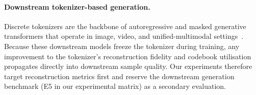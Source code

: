 \paragraph{Downstream tokenizer-based generation.}
Discrete tokenizers are the backbone of autoregressive and masked
generative transformers that operate in image, video, and
unified-multimodal settings~\citep{esser2021vqgan,chang2022maskgit,
sun2024llamagen,gu2022vqdiffusion,yu2023magvit2,yu2024titok,
kolesnikov2022uvim}. Because these downstream models freeze the
tokenizer during training, any improvement to the tokenizer's
reconstruction fidelity and codebook utilisation propagates directly
into downstream sample quality. Our experiments therefore target
reconstruction metrics first and reserve the downstream generation
benchmark (E5 in our experimental matrix) as a secondary evaluation.

